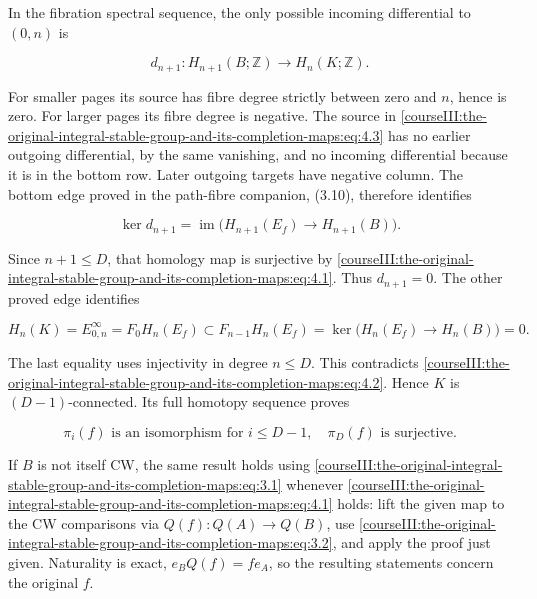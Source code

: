 In the fibration spectral sequence, the only possible incoming differential to \((0,n)\) is

\begin{equation}
d_{n+1}:H_{n+1}(B;\mathbb Z)\longrightarrow H_n(K;\mathbb Z).
 \label{courseIII:the-original-integral-stable-group-and-its-completion-maps:eq:4.3}
\end{equation}

For smaller pages its source has fibre degree strictly between zero and \(n\), hence is zero. For larger pages its fibre degree is negative. The source in \eqref{courseIII:the-original-integral-stable-group-and-its-completion-maps:eq:4.3} has no earlier outgoing differential, by the same vanishing, and no incoming differential because it is in the bottom row. Later outgoing targets have negative column. The bottom edge proved in the path-fibre companion, (3.10), therefore identifies

\begin{equation}
\ker d_{n+1}=\operatorname{im}\bigl(H_{n+1}(E_f)\to H_{n+1}(B)\bigr).
 \label{courseIII:the-original-integral-stable-group-and-its-completion-maps:eq:4.4}
\end{equation}

Since \(n+1\leq D\), that homology map is surjective by \eqref{courseIII:the-original-integral-stable-group-and-its-completion-maps:eq:4.1}. Thus \(d_{n+1}=0\). The other proved edge identifies

\begin{equation}
H_n(K)=E^\infty_{0,n}=F_0H_n(E_f)
 \subset F_{n-1}H_n(E_f)
 =\ker\bigl(H_n(E_f)\to H_n(B)\bigr)=0.
 \label{courseIII:the-original-integral-stable-group-and-its-completion-maps:eq:4.5}
\end{equation}

The last equality uses injectivity in degree \(n\leq D\). This contradicts \eqref{courseIII:the-original-integral-stable-group-and-its-completion-maps:eq:4.2}. Hence \(K\) is \((D-1)\)-connected. Its full homotopy sequence proves

\begin{equation}
\pi_i(f)\text{ is an isomorphism for }i\leq D-1,
 \quad\pi_D(f)\text{ is surjective}.
 \label{courseIII:the-original-integral-stable-group-and-its-completion-maps:eq:4.6}
\end{equation}

If \(B\) is not itself CW, the same result holds using \eqref{courseIII:the-original-integral-stable-group-and-its-completion-maps:eq:3.1} whenever \eqref{courseIII:the-original-integral-stable-group-and-its-completion-maps:eq:4.1} holds: lift the given map to the CW comparisons via \(Q(f):Q(A)\to Q(B)\), use \eqref{courseIII:the-original-integral-stable-group-and-its-completion-maps:eq:3.2}, and apply the proof just given. Naturality is exact, \(e_BQ(f)=fe_A\), so the resulting statements concern the original \(f\).

